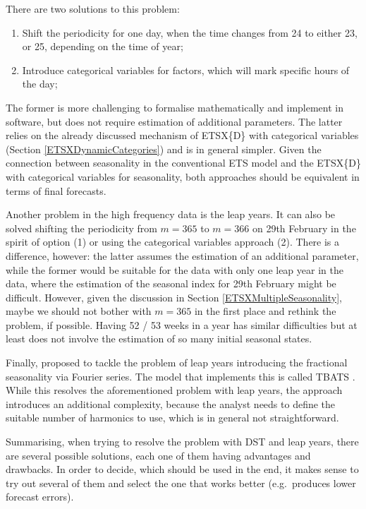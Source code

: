 \documentclass[
]{book}
\providecommand{\tightlist}{%
  \setlength{\itemsep}{0pt}\setlength{\parskip}{0pt}}
\theoremstyle{definition}
\theoremstyle{definition}
\theoremstyle{definition}
\theoremstyle{definition}
\theoremstyle{remark}
\begin{document}
There are two solutions to this problem:

\begin{enumerate}
\def\labelenumi{\arabic{enumi}.}
\tightlist
\item
  Shift the periodicity for one day, when the time changes from 24 to either 23, or 25, depending on the time of year;
\item
  Introduce categorical variables for factors, which will mark specific hours of the day;
\end{enumerate}

The former is more challenging to formalise mathematically and implement in software, but does not require estimation of additional parameters. The latter relies on the already discussed mechanism of ETSX\{D\} with categorical variables (Section \ref{ETSXDynamicCategories}) and is in general simpler. Given the connection between seasonality in the conventional ETS model and the ETSX\{D\} with categorical variables for seasonality, both approaches should be equivalent in terms of final forecasts.

Another problem in the high frequency data is the leap years. It can also be solved shifting the periodicity from \(m=365\) to \(m=366\) on 29th February in the spirit of option (1) or using the categorical variables approach (2). There is a difference, however: the latter assumes the estimation of an additional parameter, while the former would be suitable for the data with only one leap year in the data, where the estimation of the seasonal index for 29th February might be difficult. However, given the discussion in Section \ref{ETSXMultipleSeasonality}, maybe we should not bother with \(m=365\) in the first place and rethink the problem, if possible. Having 52 / 53 weeks in a year has similar difficulties but at least does not involve the estimation of so many initial seasonal states.

Finally, \citet{DeLivera2010} proposed to tackle the problem of leap years introducing the fractional seasonality via Fourier series. The model that implements this is called TBATS \citep[it is an exponential smoothing state space model with Box-Cox transformation, ARMA errors, Trend and Seasonal components,][]{DeLivera2011}. While this resolves the aforementioned problem with leap years, the approach introduces an additional complexity, because the analyst needs to define the suitable number of harmonics to use, which is in general not straightforward.

Summarising, when trying to resolve the problem with DST and leap years, there are several possible solutions, each one of them having advantages and drawbacks. In order to decide, which should be used in the end, it makes sense to try out several of them and select the one that works better (e.g.~produces lower forecast errors).
\end{document}
